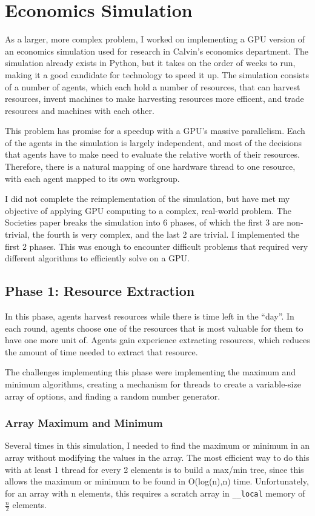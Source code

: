 \documentclass{article}
\begin{document}
\section{Economics Simulation}
As a larger, more complex problem, I worked on implementing a GPU version of an economics simulation used for research in Calvin's economics department.\cite{ditta13} The simulation already exists in Python, but it takes on the order of weeks to run, making it a good candidate for technology to speed it up. The simulation consists of a number of agents, which each hold a number of resources, that can harvest resources, invent machines to make harvesting resources more efficent, and trade resources and machines with each other.

This problem has promise for a speedup with a GPU's massive parallelism. Each of the agents in the simulation is largely independent, and most of the decisions that agents have to make need to evaluate the relative worth of their resources. Therefore, there is a natural mapping of one hardware thread to one resource, with each agent mapped to its own workgroup.

I did not complete the reimplementation of the simulation, but have met my objective of applying GPU computing to a complex, real-world problem. The Societies paper\cite{ditta13} breaks the simulation into 6 phases, of which the first 3 are non-trivial, the fourth is very complex, and the last 2 are trivial. I implemented the first 2 phases. This was enough to encounter difficult problems that required very different algorithms to efficiently solve on a GPU.

\subsection{Phase 1: Resource Extraction}
In this phase, agents harvest resources while there is time left in the ``day''. In each round, agents choose one of the resources that is most valuable for them to have one more unit of. Agents gain experience extracting resources, which reduces the amount of time needed to extract that resource.

The challenges implementing this phase were implementing the maximum and minimum algorithms, creating a mechanism for threads to create a variable-size array of options, and finding a random number generator.

\subsubsection{Array Maximum and Minimum}
Several times in this simulation, I needed to find the maximum or minimum in an array without modifying the values in the array. The most efficient way to do this with at least 1 thread for every 2 elements is to build a max/min tree, since this allows the maximum or minimum to be found in O(log(n),n) time. Unfortunately, for an array with n elements, this requires a scratch array in \texttt{\_\_local} memory of $\frac{n}{2}$ elements.
\end{document}
